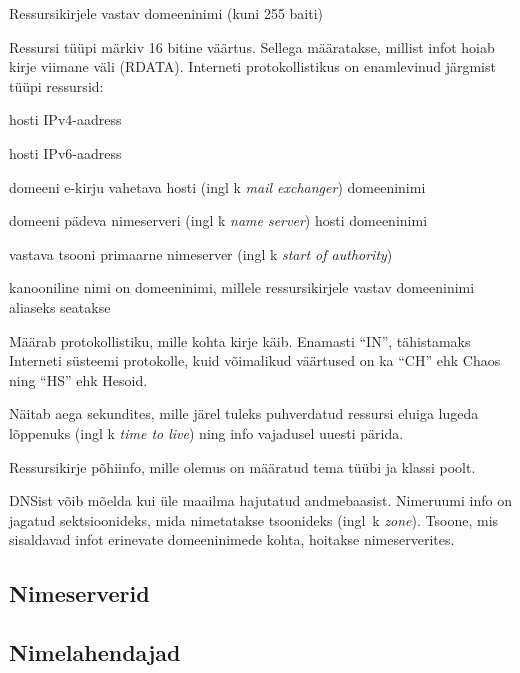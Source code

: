 \documentclass[../main.tex]{subfiles}
\begin{document}
\renewcommand{\descriptionlabel}[1]{\hspace{\labelsep}\texttt{#1}}
\begin{description}[style=multiline,leftmargin=1.5cm]
  \item[OWNER] Ressursikirjele vastav domeeninimi (kuni 255 baiti)
  \item[TYPE] Ressursi tüüpi märkiv 16 bitine väärtus. Sellega määratakse, millist infot hoiab kirje viimane väli (RDATA). Interneti protokollistikus on enamlevinud järgmist tüüpi ressursid:
    \begin{description}[style=multiline,leftmargin=1.25cm,nosep]
      \item[A] hosti IPv4-aadress
      \item[AAAA] hosti IPv6-aadress
      \item[MX] domeeni e-kirju vahetava hosti (ingl k \textit{mail exchanger}) domeeninimi
      \item[NS] domeeni pädeva nimeserveri (ingl k \textit{name server}) hosti domeeninimi
      \item[SOA] vastava tsooni primaarne nimeserver (ingl k \textit{start of authority})
      \item[CNAME] kanooniline nimi on domeeninimi, millele ressursikirjele vastav domeeninimi aliaseks seatakse
    \end{description}
  \item[CLASS] Määrab protokollistiku, mille kohta kirje käib. Enamasti \enquote{IN}, tähistamaks Interneti süsteemi protokolle, kuid võimalikud väärtused on ka \enquote{CH} ehk Chaos ning \enquote{HS} ehk Hesoid.
  \item[TTL] Näitab aega sekundites, mille järel tuleks puhverdatud ressursi eluiga lugeda lõppenuks (ingl k \textit{time to live}) ning info vajadusel uuesti pärida.
  \item[RDATA] Ressursikirje põhiinfo, mille olemus on määratud tema tüübi ja klassi poolt.
\end{description}

DNSist võib mõelda kui üle maailma hajutatud andmebaasist.
Nimeruumi info on jagatud sektsioonideks, mida nimetatakse tsoonideks (ingl~k \textit{zone}).
Tsoone, mis sisaldavad infot erinevate domeeninimede kohta, hoitakse nimeserverites.


\subsection{Nimeserverid}

\subsection{Nimelahendajad}
\end{document}
